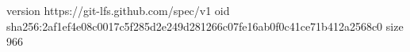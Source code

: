 version https://git-lfs.github.com/spec/v1
oid sha256:2af1ef4e08c0017c5f285d2e249d281266c07fe16ab0f0c41ce71b412a2568c0
size 966
